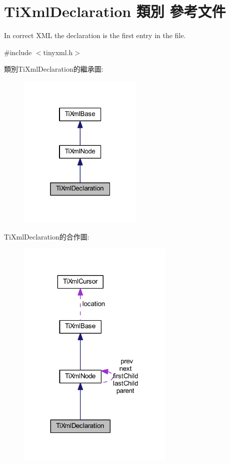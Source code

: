 \hypertarget{class_ti_xml_declaration}{}\section{Ti\+Xml\+Declaration 類別 參考文件}
\label{class_ti_xml_declaration}


In correct X\+ML the declaration is the first entry in the file.  




{\ttfamily \#include $<$tinyxml.\+h$>$}



類別\+Ti\+Xml\+Declaration的繼承圖\+:\nopagebreak
\begin{figure}[H]
\begin{center}
\leavevmode
\includegraphics[width=169pt]{class_ti_xml_declaration__inherit__graph}
\end{center}
\end{figure}


Ti\+Xml\+Declaration的合作圖\+:\nopagebreak
\begin{figure}[H]
\begin{center}
\leavevmode
\includegraphics[width=212pt]{class_ti_xml_declaration__coll__graph}
\end{center}
\end{figure}

